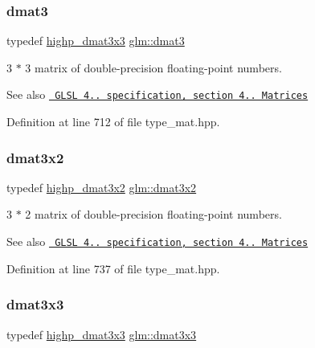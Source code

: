 \subsubsection{\texorpdfstring{dmat3}{dmat3}}
{\footnotesize\ttfamily typedef \mbox{\hyperlink{group__core__precision_ga604f966e7bf042f298beb3b262287970}{highp\+\_\+dmat3x3}} \mbox{\hyperlink{group__core__types_ga25fd62195c3ef5ac0d32ead1dbfbb929}{glm\+::dmat3}}}

3 $\ast$ 3 matrix of double-\/precision floating-\/point numbers.

\begin{DoxySeeAlso}{See also}
\href{http://www.opengl.org/registry/doc/GLSLangSpec.4.20.8.pdf}{\texttt{ G\+L\+SL 4.. specification, section 4.. Matrices}} 
\end{DoxySeeAlso}


Definition at line 712 of file type\+\_\+mat.\+hpp.

\mbox{\label{group__core__types_ga2db259d2e7921065c5b7d4dca9547960}} 
\subsubsection{\texorpdfstring{dmat3x2}{dmat3x2}}
{\footnotesize\ttfamily typedef \mbox{\hyperlink{group__core__precision_gafe7ef85b0bc26e754cbf83fed54bf106}{highp\+\_\+dmat3x2}} \mbox{\hyperlink{group__core__types_ga2db259d2e7921065c5b7d4dca9547960}{glm\+::dmat3x2}}}

3 $\ast$ 2 matrix of double-\/precision floating-\/point numbers.

\begin{DoxySeeAlso}{See also}
\href{http://www.opengl.org/registry/doc/GLSLangSpec.4.20.8.pdf}{\texttt{ G\+L\+SL 4.. specification, section 4.. Matrices}} 
\end{DoxySeeAlso}


Definition at line 737 of file type\+\_\+mat.\+hpp.

\mbox{\label{group__core__types_gaf3c29c4f75a448f308463e75ca2efd4c}} 
\subsubsection{\texorpdfstring{dmat3x3}{dmat3x3}}
{\footnotesize\ttfamily typedef \mbox{\hyperlink{group__core__precision_ga604f966e7bf042f298beb3b262287970}{highp\+\_\+dmat3x3}} \mbox{\hyperlink{group__core__types_gaf3c29c4f75a448f308463e75ca2efd4c}{glm\+::dmat3x3}}}


